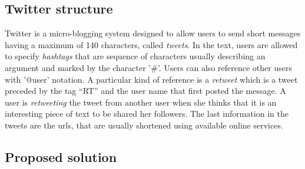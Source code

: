 \subsection{Twitter structure}
Twitter is a micro-blogging system designed to allow users to send short messages having a maximum of 140 characters, called \textit{tweets}. 
In the text, users are allowed to specify \textit{hashtags} that are sequence of characters usually describing an argument and marked by the character '\#'. 
Users can also reference other users with '@user' notation. 
A particular kind of reference is a \textit{retweet} which is a tweet preceded by the tag ``RT'' and the user name that first posted the message. 
A user is \emph{retweeting} the tweet from another user when she thinks that it is an interesting piece of text to be shared her followers.
The last information in the tweets are the urls, that are usually shortened using available online services. 

\subsection{Proposed solution}


